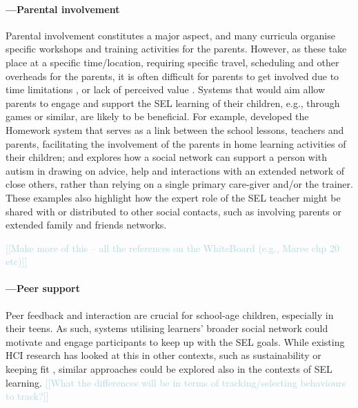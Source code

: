 \documentclass[prodmode,acmtochi]{acmsmall}
\newcommand{\todo}[1]{\textrm{\textrm{\textcolor{LightBlue}{[[#1]]} } } }
\begin{document}
\paragraph{---Parental involvement}				Parental involvement  constitutes a major aspect, and many curricula organise specific workshops and training activities for the parents. However, as these take place at a specific time/location, requiring specific travel, scheduling and other overheads for the parents, it is often difficult for parents to get involved due to time limitations \cite{Bender2011}, or lack of perceived value \cite{Lewis2011}. Systems that would aim allow parents to engage and support the SEL learning of their children, e.g., through games or similar, are likely to be beneficial. For example,  developed the Homework system that serves as a link between the school lessons, teachers and parents, facilitating the involvement of the parents in home learning activities of their children; and  explores how a social network can support a person with autism in drawing on advice, help and interactions with an extended network of close others, rather than relying on a single primary care-giver and/or the trainer. These examples also highlight how the expert role of the SEL teacher might be shared with or distributed to other social contacts, such as involving parents or extended family and friends networks. 

\todo{Make more of this -- all the references on the WhiteBoard (e.g., Maree chp 20 etc)}
				
				





\paragraph{---Peer support}
Peer feedback and interaction are crucial for school-age children, especially in their teens. As such, systems utilising learners' broader social network could motivate and engage participants to keep up with the SEL goals. While existing HCI research has looked at this in other contexts, such as sustainability \cite{Gustafsson2009, Thieme2012b} or keeping fit \cite{Lin2006,Gasser2006}, similar approaches could be explored also in the contexts of  SEL learning. \todo{What the differences will be in terms of tracking/selecting behaviours to track?}
\end{document}
